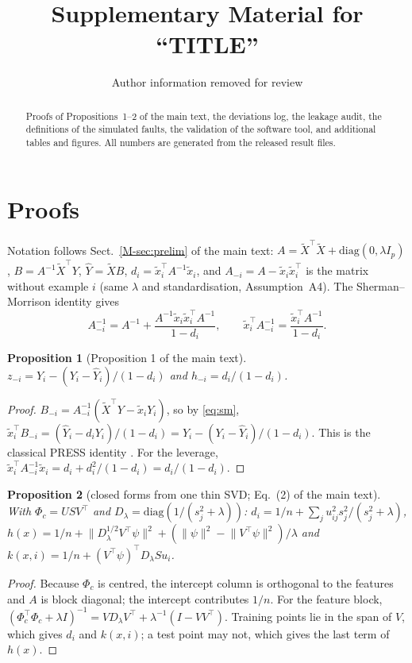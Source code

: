 \documentclass[11pt]{article}
\newtheorem{proposition}{Proposition}
\begin{document}
\title{Supplementary Material for ``TITLE''}
\author{Author information removed for review}
\date{}
\maketitle
\begin{abstract}
Proofs of Propositions~1--2 of the main text, the deviations log, the leakage audit, the definitions of the simulated faults, the validation of the software tool, and additional tables and figures. All numbers are generated from the released result files.
\end{abstract}

\section{Proofs}\label{sec:proofs}
Notation follows Sect.~\ref{M-sec:prelim} of the main text: $A=\tilde X^\top\tilde X+\mathrm{diag}(0,\lambda I_p)$, $B=A^{-1}\tilde X^\top Y$, $\hat Y=\tilde XB$, $d_i=\tilde x_i^\top A^{-1}\tilde x_i$, and $A_{-i}=A-\tilde x_i\tilde x_i^\top$ is the matrix without example $i$ (same $\lambda$ and standardisation, Assumption~A4). The Sherman--Morrison identity gives
\begin{equation}\label{eq:sm}
A_{-i}^{-1}=A^{-1}+\frac{A^{-1}\tilde x_i\tilde x_i^\top A^{-1}}{1-d_i},\qquad \tilde x_i^\top A_{-i}^{-1}=\frac{\tilde x_i^\top A^{-1}}{1-d_i}.
\end{equation}

\begin{proposition}[Proposition 1 of the main text]
$z_{-i}=Y_i-(Y_i-\hat Y_i)/(1-d_i)$ and $h_{-i}=d_i/(1-d_i)$.
\end{proposition}
\begin{proof}
$B_{-i}=A_{-i}^{-1}(\tilde X^\top Y-\tilde x_iY_i)$, so by \eqref{eq:sm}, $\tilde x_i^\top B_{-i}=(\hat Y_i-d_iY_i)/(1-d_i)=Y_i-(Y_i-\hat Y_i)/(1-d_i)$. This is the classical PRESS identity \citep{allen1974}. For the leverage, $\tilde x_i^\top A_{-i}^{-1}\tilde x_i=d_i+d_i^2/(1-d_i)=d_i/(1-d_i)$.
\end{proof}

\begin{proposition}[closed forms from one thin SVD; Eq.~(2) of the main text]
With $\Phi_c=USV^\top$ and $D_\lambda=\mathrm{diag}(1/(s_j^2+\lambda))$: $d_i=1/n+\sum_j u_{ij}^2 s_j^2/(s_j^2+\lambda)$, $h(x)=1/n+\lVert D_\lambda^{1/2}V^\top\psi\rVert^2+(\lVert\psi\rVert^2-\lVert V^\top\psi\rVert^2)/\lambda$ and $k(x,i)=1/n+(V^\top\psi)^\top D_\lambda Su_i$.
\end{proposition}
\begin{proof}
Because $\Phi_c$ is centred, the intercept column is orthogonal to the features and $A$ is block diagonal; the intercept contributes $1/n$. For the feature block, $(\Phi_c^\top\Phi_c+\lambda I)^{-1}=VD_\lambda V^\top+\lambda^{-1}(I-VV^\top)$. Training points lie in the span of $V$, which gives $d_i$ and $k(x,i)$; a test point may not, which gives the last term of $h(x)$.
\end{proof}
\end{document}
